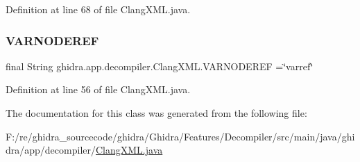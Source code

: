 Definition at line 68 of file Clang\+X\+M\+L.\+java.

\mbox{\label{classghidra_1_1app_1_1decompiler_1_1_clang_x_m_l_a6386ab78a5c2db6038aa4eb74f3c7ca3}} 
\subsubsection{\texorpdfstring{VARNODEREF}{VARNODEREF}}
{\footnotesize\ttfamily final String ghidra.\+app.\+decompiler.\+Clang\+X\+M\+L.\+V\+A\+R\+N\+O\+D\+E\+R\+EF =\char`\"{}varref\char`\"{}\hspace{0.3cm}{\ttfamily [static]}}



Definition at line 56 of file Clang\+X\+M\+L.\+java.



The documentation for this class was generated from the following file\+:\begin{DoxyCompactItemize}
\item 
F\+:/re/ghidra\+\_\+sourcecode/ghidra/\+Ghidra/\+Features/\+Decompiler/src/main/java/ghidra/app/decompiler/\mbox{\hyperlink{_clang_x_m_l_8java}{Clang\+X\+M\+L.\+java}}\end{DoxyCompactItemize}
